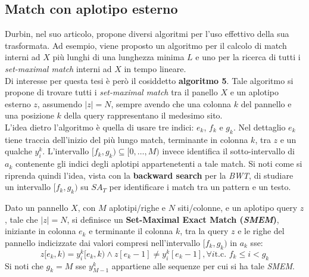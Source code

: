 \subsection{Match con aplotipo esterno}
Durbin, nel suo articolo, propone diversi algoritmi per l'uso effettivo della
sua trasformata. Ad esempio, viene proposto un algoritmo per il calcolo
di match interni ad $X$ più lunghi di una lunghezza minima $L$ e uno per la
ricerca di tutti i \textit{set-maximal match} interni ad $X$ in tempo lineare.\\
Di interesse per questa tesi è però il cosiddetto \textbf{algoritmo 5}. Tale
algoritmo 
si propone di trovare tutti i \textit{set-maximal match} tra il panello $X$ e un
aplotipo esterno $z$, assumendo $|z|=N$, sempre avendo che una colonna $k$ del
pannello e una posizione $k$ della query rappresentano il medesimo sito.\\ 
L'idea dietro l'algoritmo è quella di usare tre indici: $e_k$, $f_k$ e
$g_k$. Nel dettaglio $e_k$ tiene traccia dell'inizio del più lungo match,
terminante in colonna $k$, tra $z$ e un qualche $y_i^k$. L'intervallo
$[f_k,g_k)\subseteq[0,\ldots,M)$ invece identifica il sotto-intervallo di
$a_k$ contenente gli indici degli aplotipi appartenetenti a tale match. Si noti
come si riprenda quindi l'idea, vista con la \textbf{backward search} per la
\textit{BWT}, di studiare un intervallo $[f_k,g_k)$ su $SA_T$ per identificare i
match tra un pattern e un testo. 
\begin{definizione}
  Dato un pannello $X$, con $M$ aplotipi/righe e $N$ siti/colonne, e un aplotipo
  query $z$, tale che $|z|=N$, si definisce un \textbf{Set-Maximal Exact Match
    (\textit{SMEM})}, iniziante in colonna $e_k$ e terminante il colonna
  $k$, tra 
  la query $z$ e le righe del pannello indicizzate dai valori compresi
  nell'intervallo $[f_k,g_k)$ in $a_k$ sse:
  \begin{equation}
    \label{eq:pbwtsmem}
    z[e_k,k)=y_i^k[e_k,k)\land z[e_k-1]\neq y_i^k[e_k-1], \forall i\mbox{
      t.c. }f_k\leq i < g_k
  \end{equation}
  Si noti che $g_k=M$ sse $y_{M-1}^k$ appartiene alle sequenze per cui si ha tale
  \textit{SMEM}.
\end{definizione}

